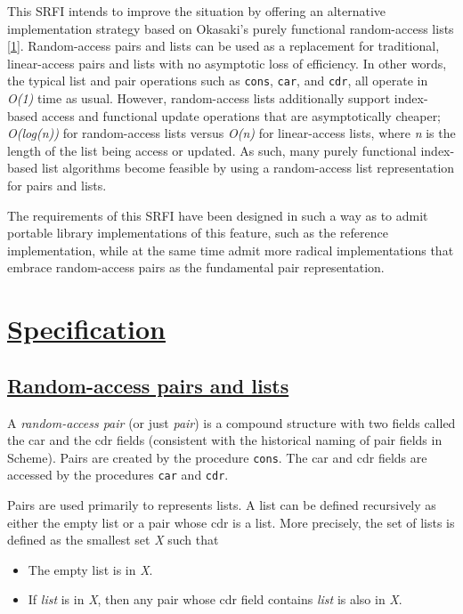 This SRFI intends to improve the situation by offering an alternative
implementation strategy based on Okasaki's purely functional
random-access lists {[}\protect\hyperlink{note-1}{1}{]}. Random-access
pairs and lists can be used as a replacement for traditional,
linear-access pairs and lists with no asymptotic loss of efficiency. In
other words, the typical list and pair operations such as \texttt{cons},
\texttt{car}, and \texttt{cdr}, all operate in \emph{O(1)} time as
usual. However, random-access lists additionally support index-based
access and functional update operations that are asymptotically cheaper;
\emph{O(log(n))} for random-access lists versus \emph{O(n)} for
linear-access lists, where \emph{n} is the length of the list being
access or updated. As such, many purely functional index-based list
algorithms become feasible by using a random-access list representation
for pairs and lists.

The requirements of this SRFI have been designed in such a way as to
admit portable library implementations of this feature, such as the
reference implementation, while at the same time admit more radical
implementations that embrace random-access pairs as the fundamental pair
representation.

\section{\texorpdfstring{\href{}{Specification}}{Specification}}\label{specification}

\subsection{\texorpdfstring{\href{}{Random-access pairs and
lists}}{Random-access pairs and lists}}\label{random-access-pairs-and-lists}

A \emph{random-access pair} (or just \emph{pair}) is a compound
structure with two fields called the car and the cdr fields (consistent
with the historical naming of pair fields in Scheme). Pairs are created
by the procedure \texttt{cons}. The car and cdr fields are accessed by
the procedures \texttt{car} and \texttt{cdr}.

Pairs are used primarily to represents lists. A list can be defined
recursively as either the empty list or a pair whose cdr is a list. More
precisely, the set of lists is defined as the smallest set \emph{X} such
that

\begin{itemize}
\tightlist
\item
  The empty list is in \emph{X}.
\item
  If \emph{list} is in \emph{X}, then any pair whose cdr field contains
  \emph{list} is also in \emph{X}.
\end{itemize}


